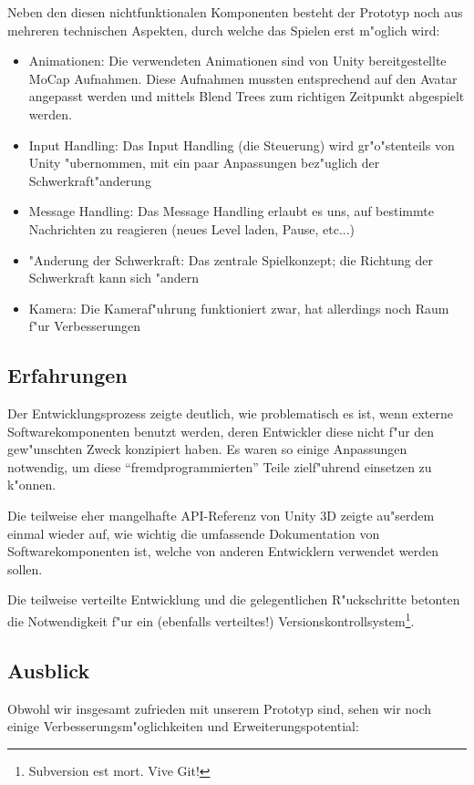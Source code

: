 Neben den diesen nichtfunktionalen Komponenten besteht der Prototyp noch aus mehreren technischen
Aspekten, durch welche das Spielen erst m"oglich wird:
\begin{itemize}
	\item Animationen: Die verwendeten Animationen sind von Unity bereitgestellte MoCap Aufnahmen.
		Diese Aufnahmen mussten entsprechend auf den Avatar angepasst werden und mittels Blend Trees zum
		richtigen Zeitpunkt abgespielt werden.
	\item Input Handling: Das Input Handling (die Steuerung) wird gr"o"stenteils von Unity "ubernommen,
		mit ein paar Anpassungen bez"uglich der Schwerkraft"anderung
	\item Message Handling: Das Message Handling erlaubt es uns, auf bestimmte Nachrichten zu reagieren
			(neues Level laden, Pause, etc...)
	\item "Anderung der Schwerkraft: Das zentrale Spielkonzept; die Richtung der Schwerkraft kann sich "andern
	\item Kamera: Die Kameraf"uhrung funktioniert zwar, hat allerdings noch Raum f"ur Verbesserungen
\end{itemize}
%
\subsection{Erfahrungen}
\label{sec:results/xp}
%
Der Entwicklungsprozess zeigte deutlich, wie problematisch es
ist, wenn externe Softwarekomponenten benutzt werden, deren
Entwickler diese nicht f"ur den gew"unschten Zweck konzipiert haben.
Es waren so einige Anpassungen notwendig, um diese
``fremdprogrammierten'' Teile zielf"uhrend einsetzen zu k"onnen.

Die teilweise eher mangelhafte API-Referenz von Unity 3D zeigte
au"serdem einmal wieder auf, wie wichtig die umfassende Dokumentation
von Softwarekomponenten ist, welche von anderen Entwicklern
verwendet werden sollen.

Die teilweise verteilte Entwicklung und die gelegentlichen R"uckschritte
betonten die Notwendigkeit f"ur ein (ebenfalls verteiltes!)
Versionskontrollsystem\footnote{Subversion est mort. Vive Git!}.
%
\subsection{Ausblick}
\label{sec:results/future}
%
Obwohl wir insgesamt zufrieden mit unserem Prototyp sind, sehen wir noch einige
Verbesserungsm"oglichkeiten und Erweiterungspotential:

